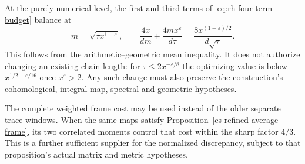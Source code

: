 At the purely numerical level, the first and third terms of
\eqref{eq:rh-four-term-budget} balance at
\[
 m=\sqrt{\tau x^{1-\varepsilon}},\qquad
 \frac{4x}{dm}+\frac{4mx^\varepsilon}{d\tau}
       =\frac{8x^{(1+\varepsilon)/2}}{d\sqrt\tau}.
\]
This follows from the arithmetic--geometric mean inequality.
It does not authorize changing an existing chain length: for
$\tau\le2x^{-\varepsilon/8}$ the optimizing value is below
$x^{1/2-\varepsilon/16}$ once $x^\varepsilon>2$.
Any such change must also preserve the construction's cohomological,
integral-map, spectral and geometric hypotheses.

The complete weighted frame cost may be used instead of the older
separate trace windows. When the same maps satisfy
Proposition~\ref{cs-refined-average-frame}, its two correlated moments
control that cost within the sharp factor $4/3$. This is a further
sufficient supplier for the normalized discrepancy, subject to that
proposition's actual matrix and metric hypotheses.



